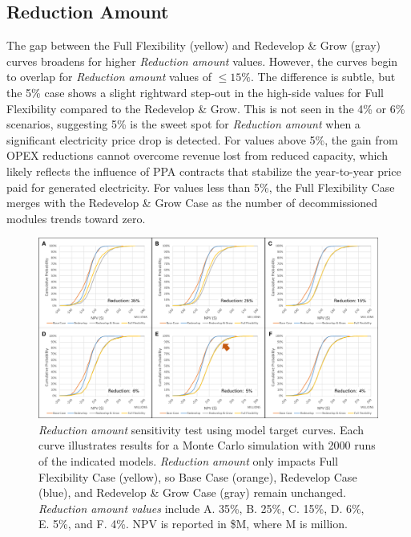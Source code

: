 \subsection{Reduction Amount}\label{ch6:sens_redamt}

The gap between the Full Flexibility (yellow) and Redevelop \& Grow (gray) curves broadens for higher \textit{Reduction amount} values. However, the curves begin to overlap for \textit{Reduction amount} values of $\leq{15}\%$. The difference is subtle, but the 5\% case shows a slight rightward step-out in the high-side values for Full Flexibility compared to the Redevelop \& Grow. This is not seen in the 4\% or 6\% scenarios, suggesting 5\% is the sweet spot for \textit{Reduction amount} when a significant electricity price drop is detected. For values above 5\%, the gain from OPEX reductions cannot overcome revenue lost from reduced capacity, which likely reflects the influence of PPA contracts that stabilize the year-to-year price paid for generated electricity. For values less than 5\%, the Full Flexibility Case merges with the Redevelop \& Grow Case as the number of decommissioned modules trends toward zero.

\begin{figure}[!htp]
\centering
\includegraphics[width=.98\textwidth]{templates/images/Figure-Sensitivity_Reduction.pdf.png}
\caption[Reduction Amount sensitivity test]{\textit{Reduction amount} sensitivity test using model target curves. Each curve illustrates results for a Monte Carlo simulation with 2000 runs of the indicated models. \textit{Reduction amount} only impacts Full Flexibility Case (yellow), so Base Case (orange), Redevelop Case (blue), and Redevelop \& Grow Case (gray) remain unchanged. \textit{Reduction amount values} include A. 35\%, B. 25\%, C. 15\%, D. 6\%, E. 5\%, and F. 4\%. NPV is reported in \$M, where M is million.}
\label{fig:sens_test_reduction}
\end{figure}

